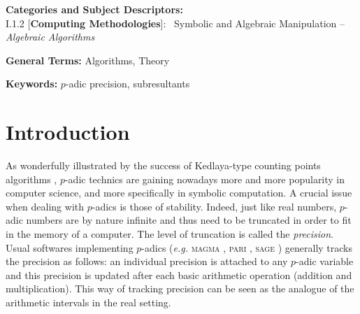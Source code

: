 \documentclass{sig-alternate}
\begin{document}
\vspace{1mm}
 \noindent
 {\bf Categories and Subject Descriptors:} \\
\noindent I.1.2 [{\bf Computing Methodologies}]:{~} Symbolic and Algebraic
  Manipulation -- \emph{Algebraic Algorithms}

 \vspace{1mm}
 \noindent
 {\bf General Terms:} Algorithms, Theory

 \vspace{1mm}
 \noindent
 {\bf Keywords:} $p$-adic precision, subresultants
\medskip

\section{Introduction}

As wonderfully illustrated by the success of Kedlaya-type counting points 
algorithms \cite{kedlaya}, $p$-adic technics are gaining nowadays more and more 
popularity in computer science, and more specifically in symbolic 
computation. A crucial issue when dealing with $p$-adics is those of 
stability. Indeed, just like real numbers, $p$-adic numbers are by nature 
infinite and thus need to be truncated in order to fit in the memory of a 
computer. The level of truncation is called the \emph{precision}. Usual 
softwares implementing $p$-adics (\emph{e.g.} \textsc{magma} \cite{magma}, 
\textsc{pari} \cite{pari}, \textsc{sage} \cite{sage}) 
generally tracks the precision as follows: an individual precision is 
attached to any $p$-adic variable and this precision is updated after 
each basic arithmetic operation (addition and multiplication). This way 
of tracking precision can be seen as the analogue of the arithmetic 
intervals in the real setting.
\end{document}

